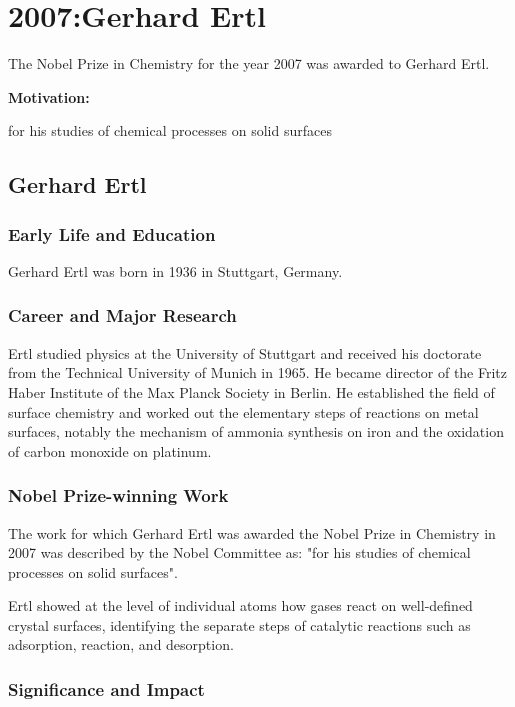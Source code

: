 \chapter{2007:Gerhard Ertl}

\label{chap:chemistry2007}

The Nobel Prize in Chemistry for the year 2007 was awarded to Gerhard Ertl.

\textbf{Motivation:}

for his studies of chemical processes on solid surfaces

\section{Gerhard Ertl}

\subsection*{Early Life and Education}

Gerhard Ertl was born in 1936 in Stuttgart, Germany.

\subsection*{Career and Major Research}

Ertl studied physics at the University of Stuttgart and received his doctorate from the Technical University of Munich in 1965. He became director of the Fritz Haber Institute of the Max Planck Society in Berlin. He established the field of surface chemistry and worked out the elementary steps of reactions on metal surfaces, notably the mechanism of ammonia synthesis on iron and the oxidation of carbon monoxide on platinum.

\subsection*{Nobel Prize-winning Work}

The work for which Gerhard Ertl was awarded the Nobel Prize in Chemistry in 2007 was described by the Nobel Committee as: "for his studies of chemical processes on solid surfaces".

Ertl showed at the level of individual atoms how gases react on well-defined crystal surfaces, identifying the separate steps of catalytic reactions such as adsorption, reaction, and desorption.

\subsection*{Significance and Impact}

